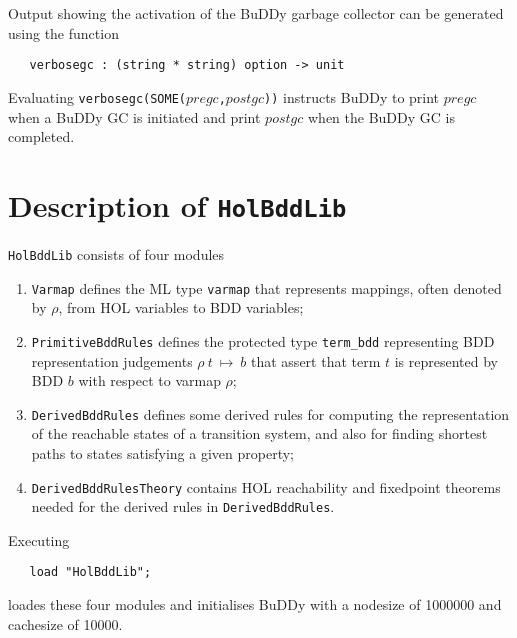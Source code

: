 \documentclass[12pt]{article}
\newcommand{\bnind}[1]{\index[MLbn]{#1}}
\renewcommand{\t}[1]{\mbox{\tt #1}}
\newcommand{\ml}[1]{{\tt #1}}
\newcommand{\termbdd}[3]{\mbox{$#1~#2~\mapsto~#3$}}
\newcommand\termbddty{\texttt{term\_bdd}\xspace}
\newcommand{\Buddy}{BuDDy\xspace}
\begin{document}
Output showing the activation of the \Buddy garbage collector can be generated
using the function

\begin{verbatim}
   verbosegc : (string * string) option -> unit
\end{verbatim}\bnind{\ml{verbosegc}}

Evaluating \t{verbosegc(SOME($pregc$,$postgc$))} instructs BuDDy to print
$pregc$ when a BuDDy GC is initiated and print $postgc$ when the
\Buddy GC is completed.

\newpage

\part{Description of \t{HolBddLib}}\label{HolBddLib}

\t{HolBddLib} consists of four modules

\begin{enumerate}
\item \t{Varmap} defines the ML type \t{varmap} that represents mappings,
often denoted by $\rho$,
from HOL variables to BDD variables;

\item \t{PrimitiveBddRules} defines the protected type \termbddty
representing BDD representation judgements \termbdd{\rho}{t}{b}
that assert that term $t$ is represented by BDD $b$ with respect to
varmap $\rho$;

\item \t{DerivedBddRules} defines some derived rules for computing
the representation of the reachable states of a transition system,
and also for finding shortest paths to states  satisfying a given property;

\item \t{DerivedBddRulesTheory} contains HOL reachability and fixedpoint theorems needed
for the derived rules in  \t{DerivedBddRules}.


\end{enumerate}


Executing

\vspace*{-2mm}

\begin{verbatim}
   load "HolBddLib";
\end{verbatim}

\vspace*{-2mm}

loades these four modules and
initialises \Buddy{} with a nodesize of 1000000
and cachesize of 10000.  
\end{document}
